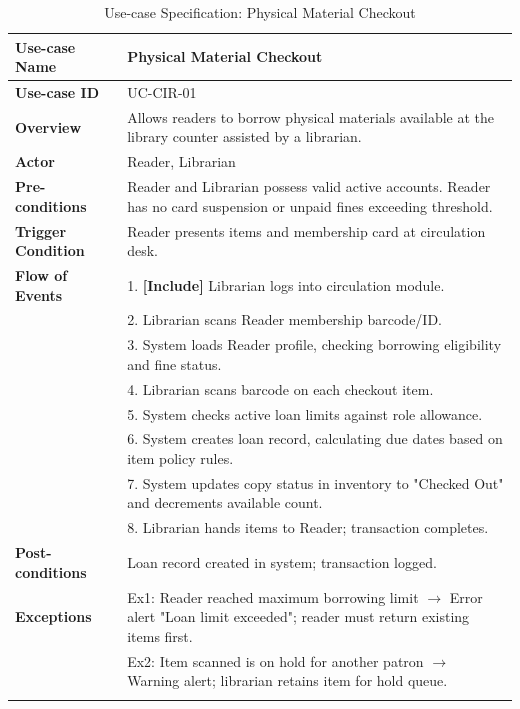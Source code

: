 \begin{longtable}{|p{3.5cm}|p{11.5cm}|}
    \hline
    \textbf{Use-case Name} & \textbf{Physical Material Checkout} \\
    \hline
    \textbf{Use-case ID} & UC-CIR-01 \\
    \hline
    \textbf{Overview} & Allows readers to borrow physical materials available at the library counter assisted by a librarian. \\
    \hline
    \textbf{Actor} & Reader, Librarian \\
    \hline
    \textbf{Pre-conditions} & Reader and Librarian possess valid active accounts. Reader has no card suspension or unpaid fines exceeding threshold. \\
    \hline
    \textbf{Trigger Condition} & Reader presents items and membership card at circulation desk. \\
    \hline
    \textbf{Flow of Events} & 
    1. \textbf{[Include]} Librarian logs into circulation module.\\ 
 & 
    2. Librarian scans Reader membership barcode/ID.\\ 
 & 
    3. System loads Reader profile, checking borrowing eligibility and fine status.\\ 
 & 
    4. Librarian scans barcode on each checkout item.\\ 
 & 
    5. System checks active loan limits against role allowance.\\ 
 & 
    6. System creates loan record, calculating due dates based on item policy rules.\\ 
 & 
    7. System updates copy status in inventory to "Checked Out" and decrements available count.\\ 
 & 
    8. Librarian hands items to Reader; transaction completes. \\
    \hline
    \textbf{Post-conditions} & Loan record created in system; transaction logged. \\
    \hline
    \textbf{Exceptions} & 
    Ex1: Reader reached maximum borrowing limit $\rightarrow$ Error alert "Loan limit exceeded"; reader must return existing items first.\\ 
 & 
    Ex2: Item scanned is on hold for another patron $\rightarrow$ Warning alert; librarian retains item for hold queue. \\
    \hline
    \caption{Use-case Specification: Physical Material Checkout} \\
\end{longtable}

